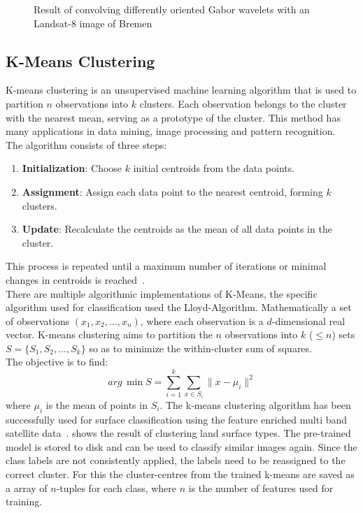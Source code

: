\documentclass[12pt,a4paper, english,twoside]{scrartcl}
\begin{document}
\begin{figure}[!htbp]
\begin{subfigure}[b]{0.45\textwidth}
           \label{fig:feat06}
       \end{subfigure}
          \caption{Result of convolving differently oriented Gabor wavelets with an Landsat-8 image of Bremen}\label{fig:gaborExample}
      \end{figure}
      \newpage
      \subsection{K-Means Clustering}\label{sec:kmeans}
    K-means clustering is an unsupervised machine learning algorithm that is used to partition $n$ observations into $k$ clusters. 
    Each observation belongs to the cluster with the nearest mean, serving as a prototype of the cluster. 
    This method has many applications in data mining, image processing and pattern recognition.\\
    The algorithm consists of three steps:
    \begin{enumerate}
        \item \textbf{Initialization}: Choose $k$ initial centroids from the data points.
        \item \textbf{Assignment}: Assign each data point to the nearest centroid, forming $k$ clusters.
        \item \textbf{Update}: Recalculate the centroids as the mean of all data points in the cluster. 
    \end{enumerate}
    This process is repeated until a maximum number of iterations or minimal changes in centroids is reached~\autocite{Sinaga2020}.\\ 
    There are multiple algorithmic implementations of K-Means, the specific algorithm used for classification used the Lloyd-Algorithm.
    Mathematically a set of observations $(x_1, x_2, \ldots, x_n)$, where each observation is a $d$-dimensional real vector.
    K-means clustering aims to partition the $n$ observations into $k$ ($\leq n$) sets $S = \{S_1, S_2, \ldots, S_k\}$ so as to minimize the within-cluster sum of squares. \\
    The objective is to find:
    \begin{equation}
        arg\,\min{S} = \sum_{i=1}^{k} \sum_{x \in S_i} \| x - \mu_i \|^2
    \end{equation}
    where $\mu_i$ is the mean of points in $S_i$.
    The k-means clustering algorithm has been successfully used for surface classification using the feature enriched multi band satellite data~\autocite[e.g.]{Burrough2000}.
     shows the result of clustering land surface types. 
    The pre-trained model is stored to disk and can be used to classify similar images again. 
    Since the class labels are not consistently applied, the labels need to be reassigned to the correct cluster.
    For this the cluster-centres from the trained k-means are saved as a array of $n$-tuples for each class, where $n$ is the number of features used for training.
    \newpage
\end{document}
